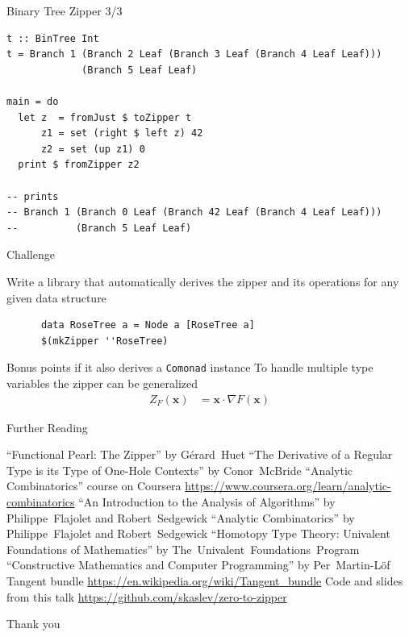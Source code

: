 \documentclass[pdf]{beamer}
\begin{document}
\begin{frame}[fragile]{Binary Tree Zipper 3/3}
  \begin{verbatim}
t :: BinTree Int
t = Branch 1 (Branch 2 Leaf (Branch 3 Leaf (Branch 4 Leaf Leaf)))
             (Branch 5 Leaf Leaf)

main = do
  let z  = fromJust $ toZipper t
      z1 = set (right $ left z) 42
      z2 = set (up z1) 0
  print $ fromZipper z2

-- prints
-- Branch 1 (Branch 0 Leaf (Branch 42 Leaf (Branch 4 Leaf Leaf)))
--          (Branch 5 Leaf Leaf)
  \end{verbatim}
\end{frame}

\begin{frame}[fragile]{Challenge}
  \begin{outline}
    \1 Write a library that automatically derives the zipper and its operations for any given data structure
    \vspace{5mm}
    \begin{verbatim}
      data RoseTree a = Node a [RoseTree a]
      $(mkZipper ''RoseTree)
    \end{verbatim}
    \vspace{3mm}
    \2 Bonus points if it also derives a \lstinline{Comonad} instance
    \vspace{1cm}
    \1 To handle multiple type variables the zipper can be generalized
    \begin{align*}
      Z_F(\bm{x}) &= \bm{x} \cdot \nabla F(\bm{x})
    \end{align*}
  \end{outline}
\end{frame}

\begin{frame}{Further Reading}
  \small
  \begin{outline}
    \1 ``Functional Pearl: The Zipper'' by \mbox{G\'erard Huet}
    \1 ``The Derivative of a Regular Type is its Type of One-Hole Contexts'' by \mbox{Conor McBride}
    \1 ``Analytic Combinatorics'' course on Coursera \url{https://www.coursera.org/learn/analytic-combinatorics}
    \1 ``An Introduction to the Analysis of Algorithms'' by \mbox{Philippe Flajolet} and \mbox{Robert Sedgewick}
    \1 ``Analytic Combinatorics'' by \mbox{Philippe Flajolet} and \mbox{Robert Sedgewick}
    \1 ``Homotopy Type Theory: Univalent Foundations of Mathematics'' by \mbox{The Univalent Foundations Program}
    \1 ``Constructive Mathematics and Computer Programming'' by \mbox{Per Martin-L\"{o}f}
    \1 Tangent bundle \url{https://en.wikipedia.org/wiki/Tangent_bundle}
    \1 Code and slides from this talk \url{https://github.com/skaslev/zero-to-zipper}
  \end{outline}
\end{frame}

\begin{frame}{Thank you}
\end{frame}
\end{document}
